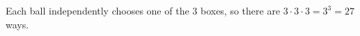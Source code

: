 Each ball independently chooses one of the $3$ boxes, so there are $3\cdot3\cdot3=3^3=\boxed{27}$ ways.
